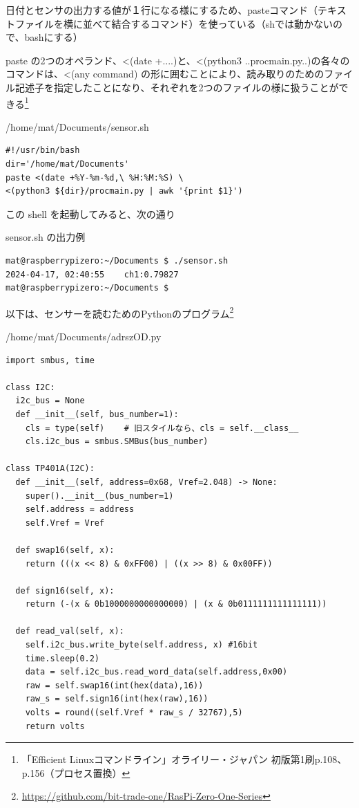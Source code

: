 \documentclass[12pt,a4paper,uplatex]{jsbook}
\begin{document}
	日付とセンサの出力する値が１行になる様にするため、pasteコマンド（テキストファイルを横に並べて結合するコマンド）を使っている\footnotemark[1]（shでは動かないので、bashにする）
	
	paste の2つのオペランド、<(date +....)と、<(python3 ..procmain.py..)の各々のコマンドは、<(any command) の形に囲むことにより、読み取りのためのファイル記述子を指定したことになり、それぞれを2つのファイルの様に扱うことができる\footnote[1]{「Efficient Linuxコマンドライン」オライリー・ジャパン 初版第1刷p.108、p.156（プロセス置換）}

\begin{itembox}[l]{/home/mat/Documents/sensor.sh}
	\begin{verbatim}
#!/usr/bin/bash
dir='/home/mat/Documents'
paste <(date +%Y-%m-%d,\ %H:%M:%S) \
<(python3 ${dir}/procmain.py | awk '{print $1}')
	\end{verbatim}
\end{itembox}

この shell を起動してみると、次の通り

\begin{itembox}[l]{sensor.sh の出力例}
	\begin{verbatim}
mat@raspberrypizero:~/Documents $ ./sensor.sh 
2024-04-17, 02:40:55	ch1:0.79827
mat@raspberrypizero:~/Documents $ 
	\end{verbatim}
\end{itembox}

以下は、センサーを読むためのPythonのプログラム\footnote{\url{https://github.com/bit-trade-one/RasPi-Zero-One-Series}
}

\begin{spacing}{0.9}
\begin{itembox}[l]{/home/mat/Documents/adrszOD.py}
	\begin{verbatim}
import smbus, time

class I2C:
  i2c_bus = None
  def __init__(self, bus_number=1):
    cls = type(self)    # 旧スタイルなら、cls = self.__class__
    cls.i2c_bus = smbus.SMBus(bus_number) 

class TP401A(I2C):
  def __init__(self, address=0x68, Vref=2.048) -> None:
    super().__init__(bus_number=1)
    self.address = address
    self.Vref = Vref

  def swap16(self, x):
    return (((x << 8) & 0xFF00) | ((x >> 8) & 0x00FF))

  def sign16(self, x):
    return (-(x & 0b1000000000000000) | (x & 0b0111111111111111))

  def read_val(self, x):
    self.i2c_bus.write_byte(self.address, x) #16bit
    time.sleep(0.2)
    data = self.i2c_bus.read_word_data(self.address,0x00)
    raw = self.swap16(int(hex(data),16))
    raw_s = self.sign16(int(hex(raw),16))
    volts = round((self.Vref * raw_s / 32767),5)
    return volts
	\end{verbatim}
\end{itembox}
\end{spacing}
\end{document}
